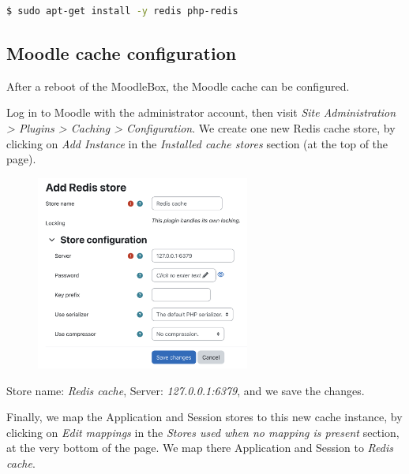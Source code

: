 \documentclass[12pt]{article}
\begin{document}
\begin{lstlisting}[language=bash]
$ sudo apt-get install -y redis php-redis
\end{lstlisting}

\subsection{Moodle cache configuration}\label{ssec-cache}

After a reboot of the MoodleBox, the Moodle cache can be configured.

Log in to Moodle with the administrator account, then visit \textsl{Site Administration > Plugins > Caching > Configuration}.
We create one new Redis cache store, by clicking on \emph{Add Instance} in the \emph{Installed cache stores} section (at the top of the page).

\begin{figure}[!ht]
\centering
\includegraphics[width=7cm]{cache-redis.png}
\end{figure}

Store name: \emph{Redis cache}, Server: \emph{127.0.0.1:6379}, and we save the changes.

Finally, we map the Application and Session stores to this new cache instance, by clicking on \emph{Edit mappings} in the \emph{Stores used when no mapping is present} section, at the very bottom of the page.
We map there Application and Session to \emph{Redis cache}.

\end{document}
